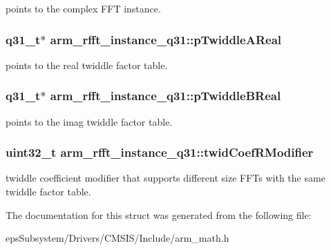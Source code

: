points to the complex F\-F\-T instance. \hypertarget{structarm__rfft__instance__q31_a2a0c944e66bab92fcbe19d1c29153250}{
\subsubsection[{p\-Twiddle\-A\-Real}]{\setlength{\rightskip}{0pt plus 5cm}q31\-\_\-t$\ast$ arm\-\_\-rfft\-\_\-instance\-\_\-q31\-::p\-Twiddle\-A\-Real}}\label{structarm__rfft__instance__q31_a2a0c944e66bab92fcbe19d1c29153250}
points to the real twiddle factor table. \hypertarget{structarm__rfft__instance__q31_ae5070be4c2e0327e618f5e1f4c5b9d80}{
\subsubsection[{p\-Twiddle\-B\-Real}]{\setlength{\rightskip}{0pt plus 5cm}q31\-\_\-t$\ast$ arm\-\_\-rfft\-\_\-instance\-\_\-q31\-::p\-Twiddle\-B\-Real}}\label{structarm__rfft__instance__q31_ae5070be4c2e0327e618f5e1f4c5b9d80}
points to the imag twiddle factor table. \hypertarget{structarm__rfft__instance__q31_a6fc90252b579f7c29e01bd279334fc43}{
\subsubsection[{twid\-Coef\-R\-Modifier}]{\setlength{\rightskip}{0pt plus 5cm}uint32\-\_\-t arm\-\_\-rfft\-\_\-instance\-\_\-q31\-::twid\-Coef\-R\-Modifier}}\label{structarm__rfft__instance__q31_a6fc90252b579f7c29e01bd279334fc43}
twiddle coefficient modifier that supports different size F\-F\-Ts with the same twiddle factor table. 

The documentation for this struct was generated from the following file\-:\begin{DoxyCompactItemize}
\item 
eps\-Subsystem/\-Drivers/\-C\-M\-S\-I\-S/\-Include/arm\-\_\-math.\-h\end{DoxyCompactItemize}
